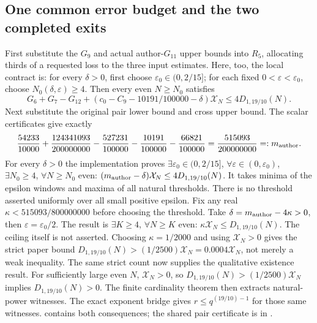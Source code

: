 \subsection{One common error budget and the two completed exits}
First substitute the $G_9$ and actual author-$G_{11}$ upper bounds into
$R_5$, allocating thirds of a requested loss to the three input estimates.
Here, too, the local contract is: for every $\delta>0$, first choose
$\varepsilon_0\in(0,2/15]$; for each fixed $0<\varepsilon<\varepsilon_0$,
choose $N_0(\delta,\varepsilon)\ge4$.  Then every even $N\ge N_0$ satisfies
\[
 G_6+G_7-G_{12}+(c_0-C_9-10191/100000-\delta)\mathcal X_N\le4D_{1,19/10}(N).
\]
Next substitute the original pair lower bound and cross upper bound.
The scalar certificates give exactly
\[
 \frac{54233}{10000}+\frac{124341093}{200000000}
 -\frac{527231}{100000}-\frac{10191}{100000}-\frac{66821}{100000}
 =\frac{515093}{200000000}=:m_{\rm author}.
\]
For every $\delta>0$ the implementation proves
$\exists\varepsilon_0\in(0,2/15]$, $\forall\varepsilon\in(0,\varepsilon_0)$,
$\exists N_0\ge4$, $\forall N\ge N_0$ even:
$(m_{\rm author}-\delta)\mathcal X_N\le4D_{1,19/10}(N)$.
It takes minima of the epsilon windows and maxima of all natural thresholds.
There is no threshold asserted uniformly over all small positive epsilon.
Fix any real $\kappa<515093/800000000$ before choosing the threshold.
Take $\delta=m_{\rm author}-4\kappa>0$, then $\varepsilon=\varepsilon_0/2$.
The result is $\exists K\ge4$, $\forall N\ge K$ even:
$\kappa \mathcal X_N\le D_{1,19/10}(N)$.  The ceiling itself is not asserted.
Choosing $\kappa=1/2000$ and using $\mathcal X_N>0$ gives the strict paper bound
$D_{1,19/10}(N)>(1/2500)\mathcal X_N=0.0004\mathcal X_N$, not merely a weak inequality.
The same strict count now supplies the qualitative existence result.
For sufficiently large even $N$, $\mathcal X_N>0$, so
$D_{1,19/10}(N)>(1/2500)\mathcal X_N$ implies $D_{1,19/10}(N)>0$.
The finite cardinality theorem then extracts natural-power witnesses.
The exact exponent bridge gives $r\le q^{(19/10)-1}$ for those same witnesses.
contains both consequences; the shared pair certificate is in
.

